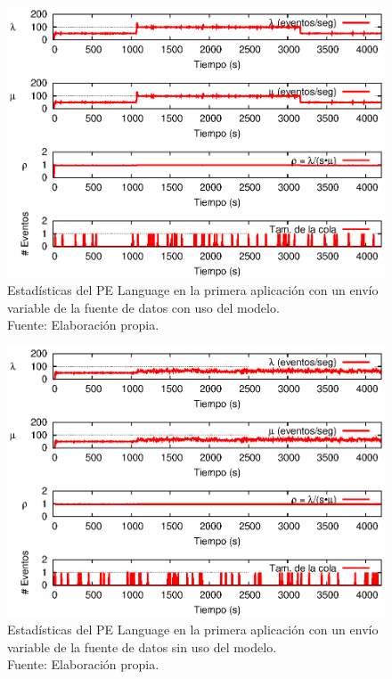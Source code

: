 \begin{figure}[!ht]
    \centering
    \captionsetup{justification=centering}
    \includegraphics[scale=1]{images/exp/app1/normal/cm/statusLanguagePE.eps}
    \caption[Estad\'isticas del PE Language en la primera aplicaci\'on con un env\'io variable de la fuente de datos con uso del modelo.]{Estad\'isticas del PE Language en la primera aplicaci\'on con un env\'io variable de la fuente de datos con uso del modelo.\\Fuente: Elaboraci\'on propia.}
    \label{fig:app1-normal-statusLanguagePE-cm}
\end{figure}

\begin{figure}[!ht]
    \centering
    \captionsetup{justification=centering}
    \includegraphics[scale=1]{images/exp/app1/normal/sm/statusLanguagePE.eps}
    \caption[Estad\'isticas del PE Language en la primera aplicaci\'on con un env\'io variable de la fuente de datos sin uso del modelo.]{Estad\'isticas del PE Language en la primera aplicaci\'on con un env\'io variable de la fuente de datos sin uso del modelo.\\Fuente: Elaboraci\'on propia.}
    \label{fig:app1-normal-statusLanguagePE-sm}
\end{figure}

